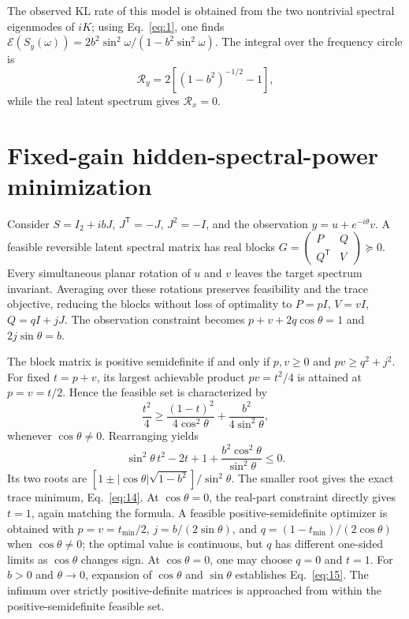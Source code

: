 The observed KL rate of this model is obtained from the two nontrivial spectral eigenmodes of $iK$; using Eq.~\eqref{eq:1}, one finds $\mathcal E(S_y(\omega))=2b^2\sin^2\omega/(1-b^2\sin^2\omega)$. The integral over the frequency circle is
\begin{equation}
 \mathcal R_y=2[(1-b^2)^{-1/2}-1],
\end{equation}
while the real latent spectrum gives $\mathcal R_x=0$.

\section{Fixed-gain hidden-spectral-power minimization}\label{app:cost}
Consider $S=I_2+ibJ$, $J^\mathsf T=-J$, $J^2=-I$, and the observation $y=u+e^{-i\theta}v$. A feasible reversible latent spectral matrix has real blocks $G=\left(\begin{smallmatrix}P&Q\\Q^\mathsf T&V\end{smallmatrix}\right)\succeq0$. Every simultaneous planar rotation of $u$ and $v$ leaves the target spectrum invariant. Averaging over these rotations preserves feasibility and the trace objective, reducing the blocks without loss of optimality to $P=pI$, $V=vI$, $Q=qI+jJ$. The observation constraint becomes $p+v+2q\cos\theta=1$ and $2j\sin\theta=b$.

The block matrix is positive semidefinite if and only if $p,v\ge0$ and $pv\ge q^2+j^2$. For fixed $t=p+v$, its largest achievable product $pv=t^2/4$ is attained at $p=v=t/2$. Hence the feasible set is characterized by
\begin{equation}
 \frac{t^2}{4}\ge\frac{(1-t)^2}{4\cos^2\theta}
 +\frac{b^2}{4\sin^2\theta},
\end{equation}
whenever $\cos\theta\ne0$. Rearranging yields
\begin{equation}
 \sin^2\theta\,t^2-2t+1
 +\frac{b^2\cos^2\theta}{\sin^2\theta}\le0.
\end{equation}
Its two roots are $[1\pm|\cos\theta|\sqrt{1-b^2}]/\sin^2\theta$. The smaller root gives the exact trace minimum, Eq.~\eqref{eq:14}. At $\cos\theta=0$, the real-part constraint directly gives $t=1$, again matching the formula. A feasible positive-semidefinite optimizer is obtained with $p=v=t_{\min}/2$, $j=b/(2\sin\theta)$, and $q=(1-t_{\min})/(2\cos\theta)$ when $\cos\theta\ne0$; the optimal value is continuous, but $q$ has different one-sided limits as $\cos\theta$ changes sign. At $\cos\theta=0$, one may choose $q=0$ and $t=1$. For $b>0$ and $\theta\to0$, expansion of $\cos\theta$ and $\sin\theta$ establishes Eq.~\eqref{eq:15}. The infimum over strictly positive-definite matrices is approached from within the positive-semidefinite feasible set.

